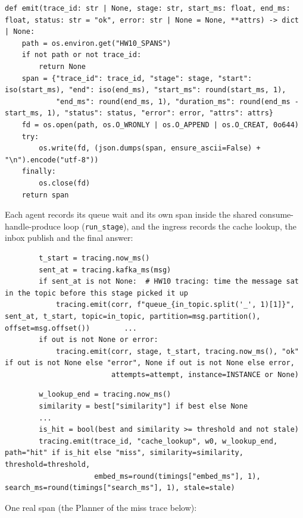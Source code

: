 \documentclass[11pt]{article}
\begin{document}
\begingroup\lstset{basicstyle=\ttfamily\tiny}
\begin{lstlisting}
def emit(trace_id: str | None, stage: str, start_ms: float, end_ms: float, status: str = "ok", error: str | None = None, **attrs) -> dict | None:
    path = os.environ.get("HW10_SPANS")
    if not path or not trace_id:
        return None
    span = {"trace_id": trace_id, "stage": stage, "start": iso(start_ms), "end": iso(end_ms), "start_ms": round(start_ms, 1),
            "end_ms": round(end_ms, 1), "duration_ms": round(end_ms - start_ms, 1), "status": status, "error": error, "attrs": attrs}
    fd = os.open(path, os.O_WRONLY | os.O_APPEND | os.O_CREAT, 0o644)
    try:
        os.write(fd, (json.dumps(span, ensure_ascii=False) + "\n").encode("utf-8"))
    finally:
        os.close(fd)
    return span
\end{lstlisting}
\endgroup
Each agent records its queue wait and its own span inside the shared consume-handle-produce loop (\texttt{run\_\allowbreak{}stage}), and the ingress records the cache lookup, the inbox publish and the final answer:

\begingroup\lstset{basicstyle=\ttfamily\tiny}
\begin{lstlisting}
        t_start = tracing.now_ms()
        sent_at = tracing.kafka_ms(msg)
        if sent_at is not None:  # HW10 tracing: time the message sat in the topic before this stage picked it up
            tracing.emit(corr, f"queue_{in_topic.split('_', 1)[1]}", sent_at, t_start, topic=in_topic, partition=msg.partition(), offset=msg.offset())        ...
        if out is not None or error:
            tracing.emit(corr, stage, t_start, tracing.now_ms(), "ok" if out is not None else "error", None if out is not None else error,
                         attempts=attempt, instance=INSTANCE or None)
\end{lstlisting}
\endgroup
\begingroup\lstset{basicstyle=\ttfamily\tiny}
\begin{lstlisting}
        w_lookup_end = tracing.now_ms()
        similarity = best["similarity"] if best else None
        ...
        is_hit = bool(best and similarity >= threshold and not stale)
        tracing.emit(trace_id, "cache_lookup", w0, w_lookup_end, path="hit" if is_hit else "miss", similarity=similarity, threshold=threshold,
                     embed_ms=round(timings["embed_ms"], 1), search_ms=round(timings["search_ms"], 1), stale=stale)
\end{lstlisting}
\endgroup
One real span (the Planner of the miss trace below):
\end{document}
